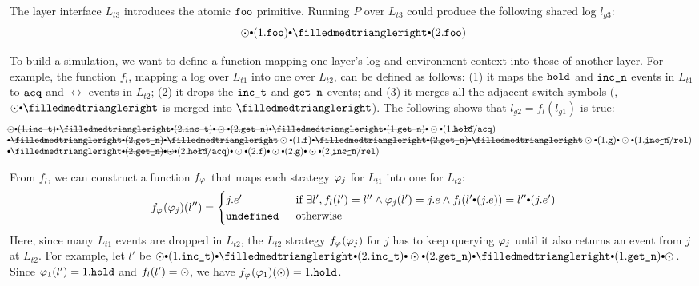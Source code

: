 The layer interface $L_{t3}$ introduces the atomic ${\texttt{foo}}$
primitive. Running $P$ over $L_{t3}$ could produce the following shared log
$l_{g3}$:
\[
\ssame \cons (1.\comm{foo})
\cons \sdiff \cons (2.\comm{foo})
\]

To build a simulation, we want to define a function mapping one
layer's log and environment context into those of another layer.  For
example, the function $f_l$, mapping a log over $L_{t1}$ into one over
$L_{t2}$, can be defined as follows: (1) it maps the ${\texttt{hold}}$ and
${\texttt{inc\_n}}$ events in $L_{t1}$ to ${\texttt{acq}}$ and $\rel$ events in $L_{t2}$; (2) it
drops the ${\texttt{inc\_t}}$ and ${\texttt{get\_n}}$ events; 
and (3) it merges all the adjacent switch symbols (\eg,
$\ssame \cons \sdiff$ is merged into $\sdiff$).
The following shows that $l_{g2} = f_l (l_{g1})$ is true:
\[
\begin{array}{l}
\hspace*{-1em}\mysout
{\ssame \cons (1.\incticket) \cons
\sdiff \cons (2.\incticket) \cons
\ssame \cons (2.\getnow) \cons
\sdiff \cons (1.\getnow) \cons
}
\ssame \cons (1.\cancel{\holdlock}/\acq) 
\\
\hspace*{-1em}\mysout
{\cons 
\sdiff \cons (2.\getnow) \cons
\sdiff 
} 
\ssame \cons (1.\comm{f}) \cons
\mysout
{\sdiff \cons (2.\getnow) \cons
\sdiff
}
\ssame \cons (1.\comm{g}) \cons
\ssame \cons (1.\cancel{\incnow}/\rel) 
\\
\hspace*{-1em}\cons \sdiff 
\mysout
{\cons (2.\getnow) \cons
\ssame 
}
\cons (2.\cancel{\holdlock}/\acq) \cons
\ssame \cons (2.\comm{f}) \cons
\ssame \cons (2.\comm{g}) \cons
\ssame \cons (2.\cancel{\incnow}/\rel) 
\end{array}
\]

From $f_l$, we can construct a function $f_{\varphi_{}}$
that maps each strategy $\varphi_{j}$ for $L_{t1}$ into one for $L_{t2}$:
\[ 
f_{\strat{}}(\strat{j}) (l'')=
\begin{cases}
j.e' & \text{if } 
\exists l', f_l(l') = l'' \wedge \strat{j}(l') = j.e
\wedge f_l(l'\cons(j.e)) = l'' \cons (j.e') \\
\comm{undefined } & \text{otherwise}
\end{cases}
\]
Here, since many $L_{t1}$ events are dropped in $L_{t2}$,
the $L_{t2}$ strategy $f_{\varphi_{}}(\varphi_{j})$ for $j$
has to keep querying $\varphi_{j}$ until
it also returns an event from $j$ at $L_{t2}$.  For example, let $l'$ be
$\ssame \cons (1.\incticket) \cons \sdiff \cons (2.\incticket) \cons
\ssame \cons (2.\getnow) \cons \sdiff \cons (1.\getnow) \cons \ssame$.
Since $\varphi_{1} (l') = 1.{\texttt{hold}}$ and $f_l(l') = \odot$, we have
$f_{\varphi_{}}(\varphi_{1}) (\odot) =1.{\texttt{hold}}$.

